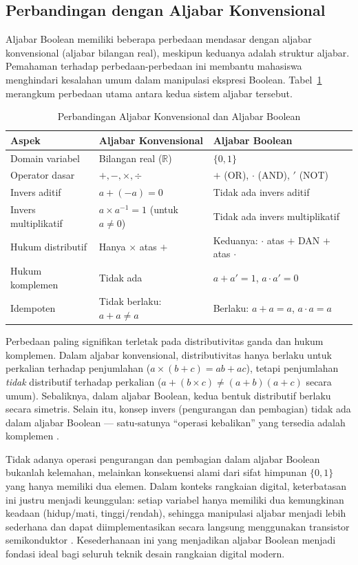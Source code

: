 \subsection{Perbandingan dengan Aljabar Konvensional}

Aljabar Boolean memiliki beberapa perbedaan mendasar dengan aljabar konvensional (aljabar bilangan real), meskipun keduanya adalah struktur aljabar. Pemahaman terhadap perbedaan-perbedaan ini membantu mahasiswa menghindari kesalahan umum dalam manipulasi ekspresi Boolean. Tabel~\ref{tab:boolean-vs-konvensional} merangkum perbedaan utama antara kedua sistem aljabar tersebut.

\begin{table}[H]
\centering
\renewcommand{\arraystretch}{1.3}
\begin{tabular}{|p{4cm}|p{5cm}|p{5cm}|}
\hline
\textbf{Aspek} & \textbf{Aljabar Konvensional} & \textbf{Aljabar Boolean} \\ \hline
Domain variabel & Bilangan real ($\mathbb{R}$) & $\{0, 1\}$ \\ \hline
Operator dasar & $+, -, \times, \div$ & $+$ (OR), $\cdot$ (AND), $'$ (NOT) \\ \hline
Invers aditif & $a + (-a) = 0$ & Tidak ada invers aditif \\ \hline
Invers multiplikatif & $a \times a^{-1} = 1$ (untuk $a \neq 0$) & Tidak ada invers multiplikatif \\ \hline
Hukum distributif & Hanya $\times$ atas $+$ & Keduanya: $\cdot$ atas $+$ DAN $+$ atas $\cdot$ \\ \hline
Hukum komplemen & Tidak ada & $a + a' = 1$, $a \cdot a' = 0$ \\ \hline
Idempoten & Tidak berlaku: $a + a \neq a$ & Berlaku: $a + a = a$, $a \cdot a = a$ \\ \hline
\end{tabular}
\caption{Perbandingan Aljabar Konvensional dan Aljabar Boolean}
\label{tab:boolean-vs-konvensional}
\end{table}

Perbedaan paling signifikan terletak pada distributivitas ganda dan hukum komplemen. Dalam aljabar konvensional, distributivitas hanya berlaku untuk perkalian terhadap penjumlahan ($a \times (b + c) = ab + ac$), tetapi penjumlahan \emph{tidak} distributif terhadap perkalian ($a + (b \times c) \neq (a+b)(a+c)$ secara umum). Sebaliknya, dalam aljabar Boolean, kedua bentuk distributif berlaku secara simetris. Selain itu, konsep invers (pengurangan dan pembagian) tidak ada dalam aljabar Boolean --- satu-satunya ``operasi kebalikan'' yang tersedia adalah komplemen \cite{rosen2019}.

Tidak adanya operasi pengurangan dan pembagian dalam aljabar Boolean bukanlah kelemahan, melainkan konsekuensi alami dari sifat himpunan $\{0, 1\}$ yang hanya memiliki dua elemen. Dalam konteks rangkaian digital, keterbatasan ini justru menjadi keunggulan: setiap variabel hanya memiliki dua kemungkinan keadaan (hidup/mati, tinggi/rendah), sehingga manipulasi aljabar menjadi lebih sederhana dan dapat diimplementasikan secara langsung menggunakan transistor semikonduktor \cite{allaboutcircuits_boolean}. Kesederhanaan ini yang menjadikan aljabar Boolean menjadi fondasi ideal bagi seluruh teknik desain rangkaian digital modern.
